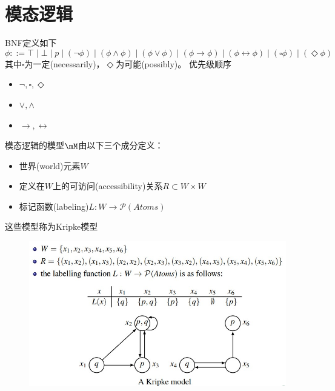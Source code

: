 
\section{模态逻辑}
\begin{definition}
BNF定义如下
\[\phi::=\top\mid
\bot\mid
p\mid
(\lnot\phi)\mid
(\phi\land\phi)\mid
(\phi\lor\phi)\mid
(\phi\to\phi)\mid
(\phi\leftrightarrow\phi)\mid
(\square\phi)\mid
(\Diamond\phi)\]
其中$\square$为一定(necessarily)，$\Diamond$为可能(possibly)。
优先级顺序
\begin{itemize}
	\item $\lnot,\square,\Diamond$
	\item $\lor,\land$
	\item $\to,\leftrightarrow$
\end{itemize}
\end{definition}
\begin{definition}[模型(model)]
模态逻辑的模型$\mM$由以下三个成分定义：
\begin{itemize}
	\item 世界(world)元素$W$
	\item 定义在$W$上的可访问(accessibility)关系$R\subset W\times W$
	\item 标记函数(labeling)$L:W\to\mathcal{P}(Atoms)$
\end{itemize}
这些模型称为Kripke模型
\end{definition}
\begin{figure}[H]
\centering
\includegraphics[width=0.8\linewidth]{fig/kripke_model.jpg}
\end{figure}

